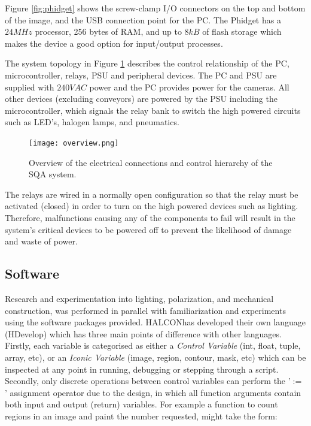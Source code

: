 \documentclass[fleqn,twoside,12pt]{report}
\begin{document}
Figure \ref{fig:phidget} shows the screw-clamp I/O connectors on the top and bottom of the image, and the USB connection point for the PC. The Phidget has a $24MHz$ processor, 256 bytes of RAM, and up to $8kB$ of flash storage which makes the device a good option for input/output processes.


The system topology in Figure \ref{fig:overview} describes the control relationship of the PC, microcontroller, relays, PSU and peripheral devices. The PC and PSU are supplied with $240VAC$ power and the PC provides power for the cameras. All other devices (excluding conveyors) are powered by the PSU including the microcontroller, which signals the relay bank to switch the high powered circuits such as LED's, halogen lamps, and pneumatics. 


\begin{figure}[h]
	\centering
	\texttt{[image: overview.png]}
	\caption{Overview of the electrical connections and control hierarchy of the SQA system.}
	\label{fig:overview}
\end{figure} 

The relays are wired in a normally open configuration so that the relay must be activated (closed) in order to turn on the high powered devices such as lighting. Therefore, malfunctions causing any of the components to fail will result in the system's critical devices to be powered off to prevent the likelihood of damage and waste of power.

\subsection{Software}
\label{sec:software}

Research and experimentation into lighting, polarization, and mechanical construction, was performed in parallel with familiarization and experiments using the software packages provided. HALCON\texttrademark has developed their own language (HDevelop\texttrademark) which has three main points of difference with other languages. Firstly, each variable is categorised as either a \textit{Control Variable} (int, float, tuple, array, etc), or an \textit{Iconic Variable} (image, region, contour, mask, etc) which can be inspected at any point in running, debugging or stepping through a script. Secondly, only discrete operations between control variables can perform the '$:=$' assignment operator due to the design, in which all function arguments contain both input and output (return) variables. For example a function to count regions in an image and paint the number requested, might take the form:
\end{document}
